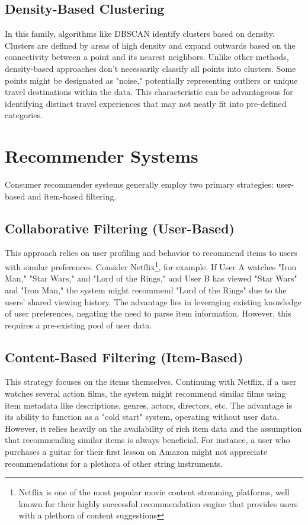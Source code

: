 \documentclass[12pt,a4paper]{report}
\begin{document}
\subsection{Density-Based Clustering} In this family, algorithms like DBSCAN identify clusters based on density\citep{10.5555/3001460.3001507}. Clusters are defined by areas of high density and expand outwards based on the connectivity between a point and its nearest neighbors. Unlike other methods, density-based approaches don't necessarily classify all points into clusters. Some points might be designated as "noise," potentially representing outliers or unique travel destinations within the data. This characteristic can be advantageous for identifying distinct travel experiences that may not neatly fit into pre-defined categories.

\section{Recommender Systems}

Consumer recommender systems generally employ two primary strategies: user-based and item-based filtering.

\subsection{Collaborative Filtering (User-Based)} This approach relies on user profiling and behavior to recommend items to users with similar preferences. Consider Netflix\footnote{Netflix is one of the most popular movie content streaming platforms, well known for their highly successful recommendation engine that provides users with a plethora of content suggestions}, for example. If User A watches "Iron Man," "Star Wars," and "Lord of the Rings," and User B has viewed "Star Wars" and "Iron Man," the system might recommend "Lord of the Rings" due to the users' shared viewing history. The advantage lies in leveraging existing knowledge of user preferences, negating the need to parse item information. However, this requires a pre-existing pool of user data.

\subsection{Content-Based Filtering (Item-Based)} This strategy focuses on the items themselves. Continuing with Netflix, if a user watches several action films, the system might recommend similar films using item metadata like descriptions, genres, actors, directors, etc. The advantage is its ability to function as a "cold start" system, operating without user data. However, it relies heavily on the availability of rich item data and the assumption that recommending similar items is always beneficial. For instance, a user who purchases a guitar for their first lesson on Amazon might not appreciate recommendations for a plethora of other string instruments.
\end{document}
